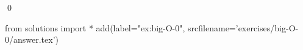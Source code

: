 
\begin{ex} 
  \label{ex:big-O-0}
  
  \qed
\end{ex} 
\begin{python0}
from solutions import *
add(label="ex:big-O-0",
    srcfilename='exercises/big-O-0/answer.tex') 
\end{python0}
